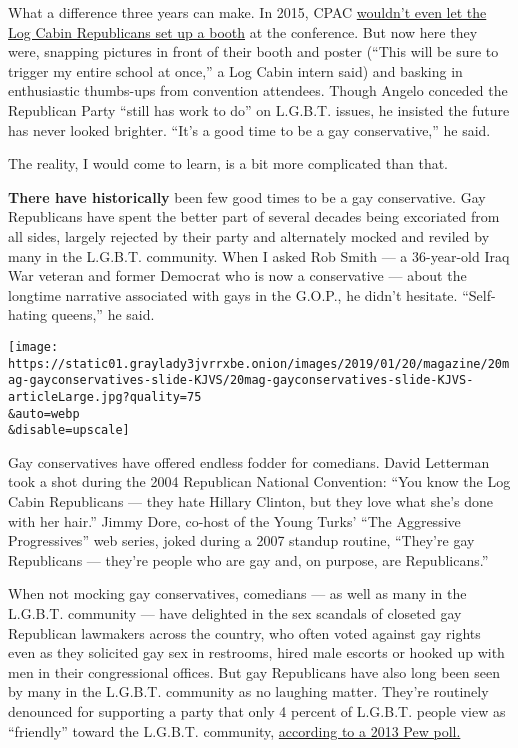 What a difference three years can make. In 2015, CPAC
\href{https://www.politico.com/story/2015/02/log-cabin-republicans-cpac-115336}{wouldn't
even let the Log Cabin Republicans set up a booth} at the conference.
But now here they were, snapping pictures in front of their booth and
poster (``This will be sure to trigger my entire school at once,'' a Log
Cabin intern said) and basking in enthusiastic thumbs-ups from
convention attendees. Though Angelo conceded the Republican Party
``still has work to do'' on L.G.B.T. issues, he insisted the future has
never looked brighter. ``It's a good time to be a gay conservative,'' he
said.

The reality, I would come to learn, is a bit more complicated than that.

\textbf{There have historically} been few good times to be a gay
conservative. Gay Republicans have spent the better part of several
decades being excoriated from all sides, largely rejected by their party
and alternately mocked and reviled by many in the L.G.B.T. community.
When I asked Rob Smith --- a 36-year-old Iraq War veteran and former
Democrat who is now a conservative --- about the longtime narrative
associated with gays in the G.O.P., he didn't hesitate. ``Self-hating
queens,'' he said.

\texttt{[image: https://static01.graylady3jvrrxbe.onion/images/2019/01/20/magazine/20mag-gayconservatives-slide-KJVS/20mag-gayconservatives-slide-KJVS-articleLarge.jpg?quality=75\\\&auto=webp\\\&disable=upscale]}

Gay conservatives have offered endless fodder for comedians. David
Letterman took a shot during the 2004 Republican National Convention:
``You know the Log Cabin Republicans --- they hate Hillary Clinton, but
they love what she's done with her hair.'' Jimmy Dore, co-host of the
Young Turks' ``The Aggressive Progressives'' web series, joked during a
2007 standup routine, ``They're gay Republicans --- they're people who
are gay and, on purpose, are Republicans.''

When not mocking gay conservatives, comedians --- as well as many in the
L.G.B.T. community --- have delighted in the sex scandals of closeted
gay Republican lawmakers across the country, who often voted against gay
rights even as they solicited gay sex in restrooms, hired male escorts
or hooked up with men in their congressional offices. But gay
Republicans have also long been seen by many in the L.G.B.T. community
as no laughing matter. They're routinely denounced for supporting a
party that only 4 percent of L.G.B.T. people view as ``friendly'' toward
the L.G.B.T. community,
\href{http://www.pewsocialtrends.org/2013/06/13/a-survey-of-lgbt-americans/}{according
to a 2013 Pew poll.}

